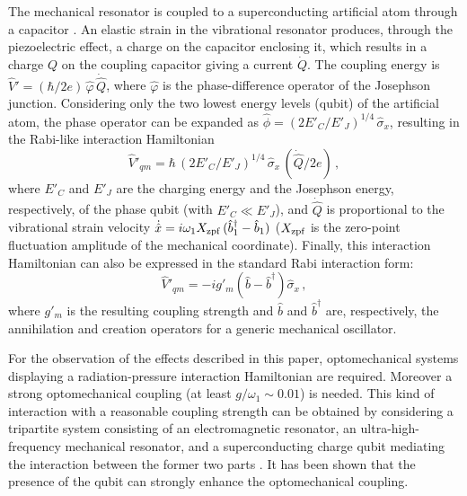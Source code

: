 \documentclass[aps,pra,twocolumn,floatfix,longbibliography, superscriptaddress]{revtex4-1}
\newcommand{\be}{\begin{equation}}
\newcommand{\ee}{\end{equation}}
\begin{document}
The mechanical resonator is coupled to a superconducting artificial atom through a capacitor \cite{OConnell2010}. An elastic strain in the vibrational resonator produces, through the piezoelectric effect, a charge on the capacitor enclosing it, which results in a charge $Q$ on the coupling capacitor giving a current $\dot {Q}$. 
The coupling energy is $\hat V' = (\hbar /2e)\,  \hat \varphi\,  \dot {\hat Q}$, where $\hat \varphi$ is the phase-difference operator of the Josephson junction. Considering only the two lowest energy levels (qubit) of the artificial atom, the phase operator can be expanded as $\hat \phi = (2 E'_C / E'_J)^{1/4}\, \hat \sigma_x$, resulting in the Rabi-like interaction Hamiltonian
\be\label{Vqm}
\hat V'_{qm} = \hbar \,  (2 E'_C / E'_J)^{1/4}\, \hat \sigma_x\,  (\dot {\hat Q}/2e)\, ,
\ee
where  $E'_C$ and $E'_J$ are the charging energy and the Josephson energy, respectively, of the phase qubit (with $E'_C \ll E'_J$), and $\dot {\hat Q}$ is proportional to the vibrational strain velocity $\dot {\hat x} = i \omega_1 X_{\rm zpf}\,  (\hat b_1^\dag - \hat b_1)$ ($X_{\rm zpf}$ is the zero-point fluctuation amplitude of the mechanical coordinate). Finally, this interaction Hamiltonian can also be expressed in the standard Rabi interaction form:
\be
\hat V'_{qm} = -i g'_m (\hat b - \hat b^\dag) \hat \sigma_x\, , 
\ee
where $g'_m$ is the resulting coupling strength and $\hat b$ and $\hat b^\dag$ are, respectively, the annihilation and creation operators for a generic mechanical oscillator.

For the observation of the effects described in this paper, optomechanical systems displaying a radiation-pressure interaction Hamiltonian are required.
Moreover a strong optomechanical coupling (at least $g/\omega_1 \sim 0.01$) is needed. This kind of interaction with a reasonable coupling strength can be obtained by considering a tripartite system consisting of an electromagnetic resonator, an ultra-high-frequency mechanical resonator, and a superconducting  charge qubit mediating the interaction between the former two parts \cite{Heikkila2014,Pirkkalainen2015}. It has been shown that the presence of the qubit can strongly enhance the optomechanical coupling.
\end{document}
